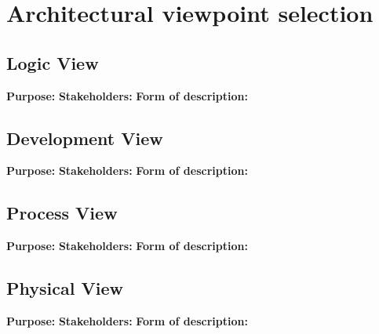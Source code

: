 \section{Architectural viewpoint selection} 
\label{architecturalviewpointselection}


\subsection{Logic View}
{\bf Purpose: }
{\bf Stakeholders: }
{\bf Form of description: }

\subsection{Development View}
{\bf Purpose: }
{\bf Stakeholders: }
{\bf Form of description: }

\subsection{Process View}
{\bf Purpose: }
{\bf Stakeholders: }
{\bf Form of description: }

\subsection{Physical View}
{\bf Purpose: }
{\bf Stakeholders: }
{\bf Form of description: }